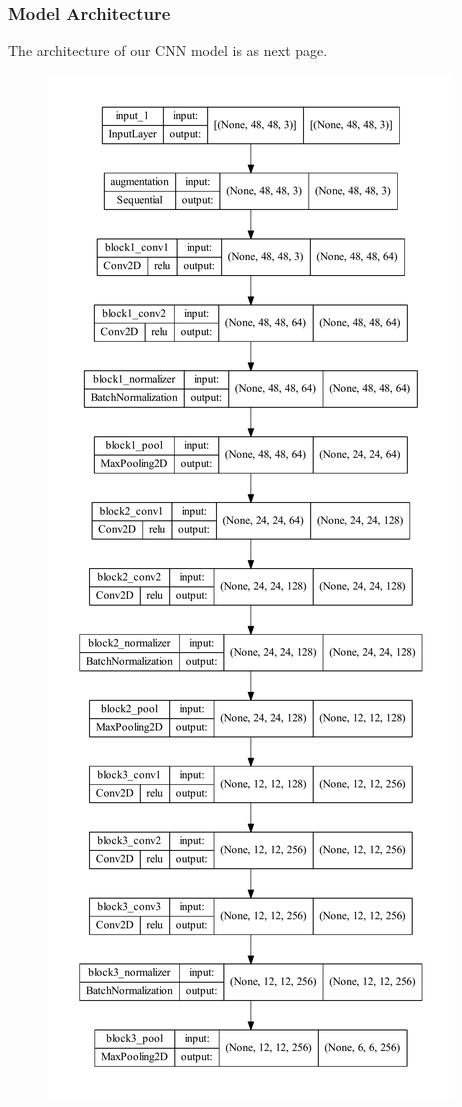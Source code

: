 \documentclass[11pt,a4paper]{article}
\begin{document}
    \subsubsection{Model Architecture}
    The architecture of our CNN model is as next page.
    \begin{figure}[H]
        \centering
        \begin{minipage}[b]{.4\textwidth}
            \centering
            \includegraphics[height = 0.9\textheight]{written_report/pictures/model_1.pdf}

\end{minipage}
\end{figure}
\end{document}
